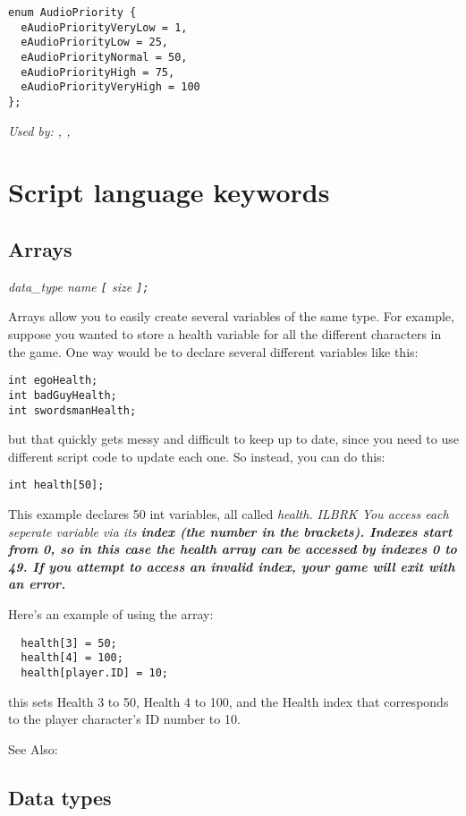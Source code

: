 \begin{verbatim}
enum AudioPriority {
  eAudioPriorityVeryLow = 1,
  eAudioPriorityLow = 25,
  eAudioPriorityNormal = 50,
  eAudioPriorityHigh = 75,
  eAudioPriorityVeryHigh = 100
};
\end{verbatim}
\it{Used by:} ,
,


\section{Script language keywords}


\subsection{Arrays}\label{Arrays}%

\it{data_type} \it{name} \verb$[$ \it{size} \verb$];$

Arrays allow you to easily create several variables of the same type. For example,
suppose you wanted to store a health variable for all the different characters in the game.
One way would be to declare several different variables like this:
\begin{verbatim}
int egoHealth;
int badGuyHealth;
int swordsmanHealth;
\end{verbatim}
but that quickly gets messy and difficult to keep up to date, since you need to use
different script code to update each one. So instead, you can do this:
\begin{verbatim}
int health[50];
\end{verbatim}
This example declares 50 int variables, all called \it{health}. ILBRK
You access each seperate variable via its \bf{index} (the number in the brackets). Indexes
start from 0, so in this case the \it{health} array can be accessed by indexes 0 to 49.
If you attempt to access an invalid index, your game will exit with an error.

Here's an example of using the array:
\begin{verbatim}
  health[3] = 50;
  health[4] = 100;
  health[player.ID] = 10;
\end{verbatim}
this sets Health 3 to 50, Health 4 to 100, and the Health index that corresponds to the player
character's ID number to 10.

See Also: 


\subsection{Data types}\label{Datatypes}%

